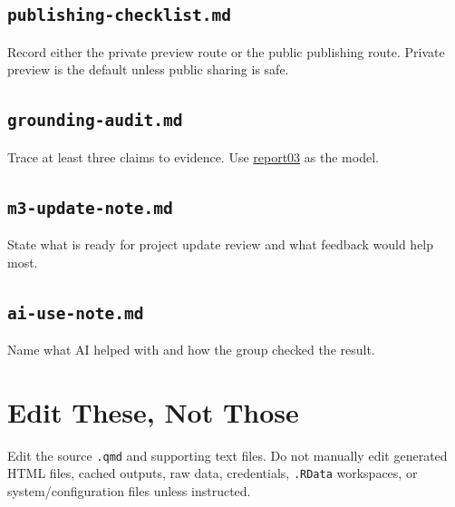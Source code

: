 \documentclass[
  letterpaper,
  DIV=11,
  numbers=noendperiod,
  oneside]{scrreprt}
\begin{document}
\subsection*{\texorpdfstring{\texttt{publishing-checklist.md}}{publishing-checklist.md}}\label{publishing-checklist.md}

Record either the private preview route or the public publishing route.
Private preview is the default unless public sharing is safe.

\subsection*{\texorpdfstring{\texttt{grounding-audit.md}}{grounding-audit.md}}\label{grounding-audit.md}

Trace at least three claims to evidence. Use
\hyperref[citations-and-grounding]{report03} as the model.

\subsection*{\texorpdfstring{\texttt{m3-update-note.md}}{m3-update-note.md}}\label{m3-update-note.md}

State what is ready for project update review and what feedback would
help most.

\subsection*{\texorpdfstring{\texttt{ai-use-note.md}}{ai-use-note.md}}\label{ai-use-note.md-4}

Name what AI helped with and how the group checked the result.

\section*{Edit These, Not Those}\label{edit-these-not-those}


Edit the source \texttt{.qmd} and supporting text files. Do not manually
edit generated HTML files, cached outputs, raw data, credentials,
\texttt{.RData} workspaces, or system/configuration files unless
instructed.
\end{document}
